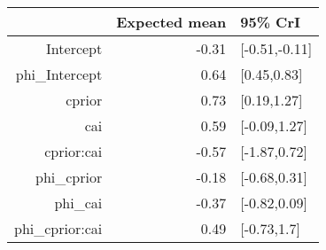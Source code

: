 \begin{tabular}{rrl}
  \hline
 & Expected mean & 95\% CrI \\ 
  \hline
Intercept & -0.31 & [-0.51,-0.11] \\ 
  phi\_Intercept & 0.64 & [0.45,0.83] \\ 
  cprior & 0.73 & [0.19,1.27] \\ 
  cai & 0.59 & [-0.09,1.27] \\ 
  cprior:cai & -0.57 & [-1.87,0.72] \\ 
  phi\_cprior & -0.18 & [-0.68,0.31] \\ 
  phi\_cai & -0.37 & [-0.82,0.09] \\ 
  phi\_cprior:cai & 0.49 & [-0.73,1.7] \\ 
   \hline
\end{tabular}

